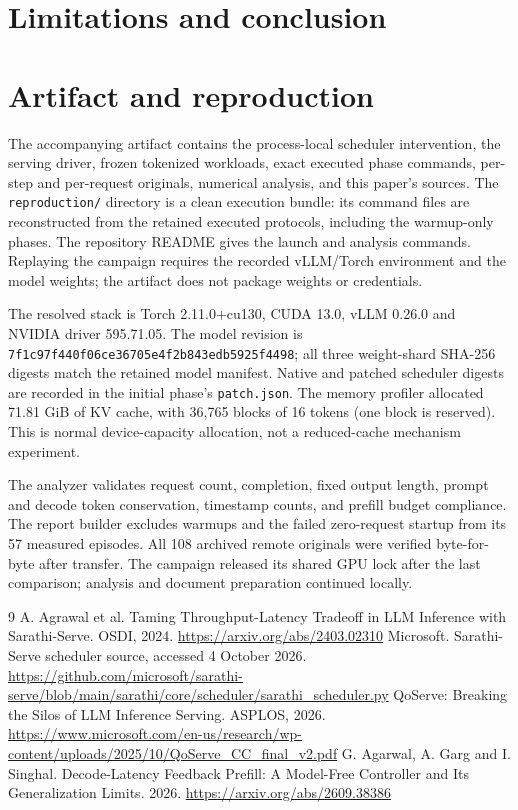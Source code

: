 \documentclass[10pt,a4paper]{article}
\begin{document}
\section{Limitations and conclusion}


\clearpage
\section*{Artifact and reproduction}
The accompanying artifact contains the process-local scheduler intervention,
the serving driver, frozen tokenized workloads, exact executed phase commands,
per-step and per-request originals, numerical analysis, and this paper's sources.
The \texttt{reproduction/} directory is a clean execution bundle: its command
files are reconstructed from the retained executed protocols, including the
warmup-only phases. The repository README gives the launch and analysis commands.
Replaying the campaign requires the recorded vLLM/Torch environment and the
model weights; the artifact does not package weights or credentials.

The resolved stack is Torch 2.11.0+cu130, CUDA 13.0, vLLM 0.26.0 and NVIDIA
driver 595.71.05. The model revision is
\texttt{7f1c97f440f06ce36705e4f2b843edb5925f4498}; all three weight-shard SHA-256
digests match the retained model manifest. Native and patched scheduler digests
are recorded in the initial phase's \texttt{patch.json}.
The memory profiler allocated 71.81 GiB of KV cache, with 36,765 blocks of
16 tokens (one block is reserved). This is normal device-capacity allocation,
not a reduced-cache mechanism experiment.

The analyzer validates request count, completion, fixed output length, prompt
and decode token conservation, timestamp counts, and prefill budget compliance.
The report builder excludes warmups and the failed zero-request startup from
its 57 measured episodes. All 108 archived remote originals were verified
byte-for-byte after transfer. The campaign released its shared GPU lock after
the last comparison; analysis and document preparation continued locally.

\begin{thebibliography}{9}
 A. Agrawal et al. Taming Throughput-Latency Tradeoff in LLM
Inference with Sarathi-Serve. OSDI, 2024.
\url{https://arxiv.org/abs/2403.02310}
 Microsoft. Sarathi-Serve scheduler source, accessed 4 October 2026.
\url{https://github.com/microsoft/sarathi-serve/blob/main/sarathi/core/scheduler/sarathi_scheduler.py}
 QoServe: Breaking the Silos of LLM Inference Serving. ASPLOS, 2026.
\url{https://www.microsoft.com/en-us/research/wp-content/uploads/2025/10/QoServe_CC_final_v2.pdf}
 G. Agarwal, A. Garg and I. Singhal. Decode-Latency Feedback Prefill:
A Model-Free Controller and Its Generalization Limits. 2026.
\url{https://arxiv.org/abs/2609.38386}
\end{thebibliography}
\end{document}

